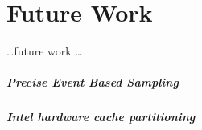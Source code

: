 \chapter{Future Work}
\label{sec:futurework}

\ldots future work \ldots


\paragraph{Precise Event Based Sampling}
\paragraph{Intel hardware cache partitioning}

\cleardoublepage

